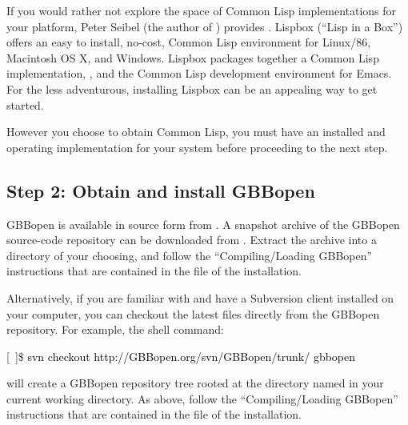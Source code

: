 \documentclass[10pt,twoside,english,pdftex]{article}
\begin{document}
If you would rather not explore the space of Common Lisp implementations for
your platform, Peter Seibel (the author of ) provides
.  Lispbox
(``Lisp in a Box'') offers an easy to install, no-cost, Common Lisp
environment for Linux/86, Macintosh OS X, and Windows.  Lispbox packages
together a Common Lisp implementation,
, and the
 Common Lisp
development environment for Emacs.  For the less adventurous, installing
Lispbox can be an appealing way to get started.

However you choose to obtain Common Lisp, you must have an installed and
operating implementation for your system before proceeding to the next step.

\subsection*{Step 2: Obtain and install GBBopen}

%
%
GBBopen is available in source form from
.  A snapshot archive of
the GBBopen source-code repository can be downloaded from
.
Extract the archive into a directory of your choosing, and follow the
``Compiling/Loading GBBopen'' instructions that are contained in the
 file of the installation.

%
%
Alternatively, if you are familiar with
 and have a Subversion
client installed on your computer, you can checkout the latest files directly
from the GBBopen repository.  For example, the shell command:
%
\W\supp
\begin{example}
\textcolor{darkergray}{%
  [~]\$ \textcolor{black}{svn checkout http://GBBopen.org/svn/GBBopen/trunk/ gbbopen}}
\end{example}
%
will create a GBBopen repository tree rooted at the directory named
 in your current working directory.  As above, follow the
``Compiling/Loading GBBopen'' instructions that are contained in the
 file of the installation.
\end{document}
